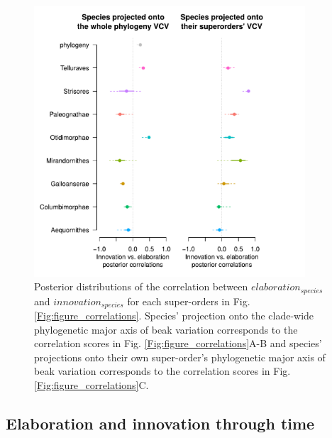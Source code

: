 \documentclass[12pt,a4paper]{article}
\begin{document}
\begin{figure}[H]
\centering
   \includegraphics[width=0.9\textwidth]{Figures/correlations_fable.pdf}
\caption{Posterior distributions of the correlation between $elaboration_{species}$ and $innovation_{species}$ for each super-orders in Fig. \ref{Fig:figure_correlations}. Species' projection onto the clade-wide phylogenetic major axis of beak variation corresponds to the correlation scores in Fig. \ref{Fig:figure_correlations}A-B and species' projections onto their own super-order's phylogenetic major axis of beak variation corresponds to the correlation scores in Fig. \ref{Fig:figure_correlations}C.}
\label{Fig:fable_correlations_supplementary}
\end{figure}

\newpage

\begin{landscape}

\end{landscape}

\newpage

\subsection{Elaboration and innovation through time}
\end{document}
